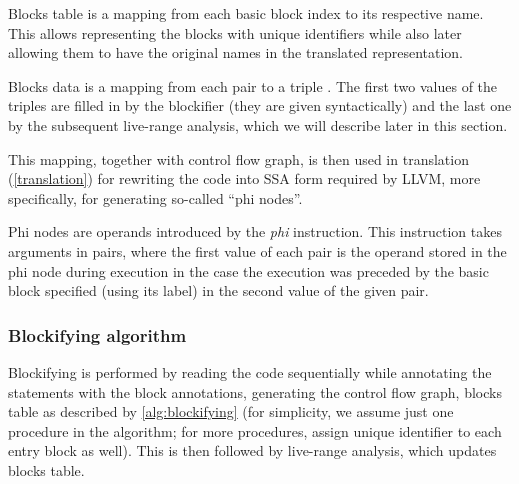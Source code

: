 \begin{defn}
    Blocks table is a mapping from each basic block index to its respective name. This allows representing the blocks with unique identifiers while also later allowing them to have the original names in the translated representation.
\end{defn}

\begin{defn}
    Blocks data is a mapping from each pair \linebreak {} to a triple . The first two values of the triples are filled in by the blockifier (they are given syntactically) and the last one by the subsequent live-range analysis, which we will describe later in this section.

    This mapping, together with control flow graph, is then used in translation (\cref{translation}) for rewriting the code into SSA form required by LLVM, more specifically, for generating so-called ``phi nodes''.
\end{defn}

Phi nodes are operands introduced by the \emph{phi} instruction. This instruction takes arguments in  pairs, where the first value of each pair is the operand stored in the phi node during execution in the case the execution was preceded by the basic block specified (using its label) in the second value of the given pair.

\subsubsection{Blockifying algorithm}

Blockifying is performed by reading the code sequentially while annotating the statements with the block annotations, generating the control flow graph, blocks table as described by \cref{alg:blockifying} (for simplicity, we assume just one procedure in the algorithm; for more procedures, assign unique identifier to each entry block as well). This is then followed by live-range analysis, which updates blocks table.

